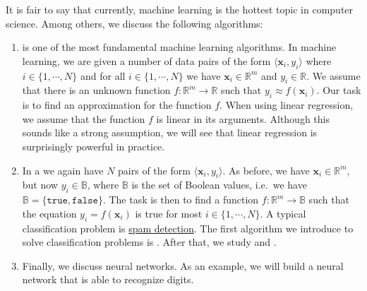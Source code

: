 \begin{enumerate}
      It is fair to say that currently, machine learning is the hottest topic in computer science.
      Among others, we discuss the following algorithms:
      \begin{enumerate}
      \item {} is one of the most fundamental machine learning algorithms.
            In machine learning, we are given a number of data pairs of the form  $\langle \mathbf{x}_i, y_i \rangle$ 
            where $i \in \{1,\cdots,N\}$ and for all $i \in \{1,\cdots,N\}$ we have $\mathbf{x}_i \in \mathbb{R}^m$
            and $y_i \in \mathbb{R}$.  We assume that there is an unknown function $f:\mathbb{R}^m \rightarrow \mathbb{R}$
            such that $y_i \approx f(\mathbf{x}_i)$.  Our task is to find an approximation for the function
            $f$.  When using linear regression, we assume that the function $f$ is linear in its arguments.
            Although this sounds like a strong assumption, we will see that linear regression is surprisingly
            powerful in practice.
      \item In a  we again have $N$ pairs of the form $\langle \mathbf{x}_i, y_i
        \rangle$.
            As before,  we have $\mathbf{x}_i \in \mathbb{R}^m$, but now $y_i \in \mathbb{B}$, where
            $\mathbb{B}$ is the set of Boolean values, i.e.~we have $\mathbb{B} = \{\mathtt{true}, \mathtt{false}\}$.
            The task is then to find a function $f:\mathbb{R}^m \rightarrow \mathbb{B}$
            such that the equation $y_i = f(\mathbf{x}_i)$ is true for most $i\in\{1,\cdots,N\}$.  A typical
            classification problem is \href{https://en.wikipedia.org/wiki/Email_spam}{spam detection}.  The
            first algorithm we introduce to solve classification problems is .
            After that, we study  and .
      \item Finally, we discuss neural networks.  As an example, we will build a neural network that is able to
            recognize digits. 
      \end{enumerate}
\end{enumerate}

